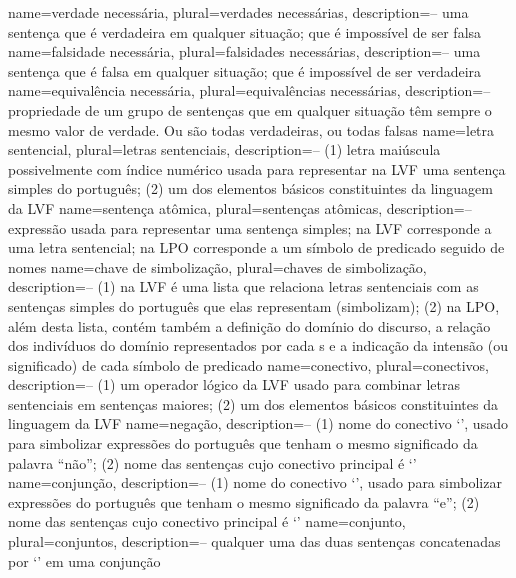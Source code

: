 {
name={verdade necessária},
plural={verdades necessárias},
description={-- uma sentença que é verdadeira em qualquer situação; que é impossível de ser falsa}
}
{
name={falsidade necessária},
plural={falsidades necessárias},
description={-- uma sentença que é falsa em qualquer situação; que é impossível de ser verdadeira}
}
{
 name={equivalência necessária},
 plural={equivalências necessárias},
 description={-- propriedade de um grupo de sentenças que em qualquer situação têm sempre o mesmo valor de verdade. Ou são todas verdadeiras, ou todas falsas}
}
{
name=letra sentencial,
plural=letras sentenciais,
description={-- (1) letra maiúscula possivelmente com índice numérico usada para representar na LVF uma sentença simples do português; (2) um dos elementos básicos constituintes da linguagem da LVF}
}
{
name=sentença atômica,
plural=sentenças atômicas,
description={-- expressão usada para representar uma sentença simples; na LVF corresponde a uma letra sentencial; na LPO corresponde a um símbolo de predicado seguido de nomes}
}
{
name=chave de simbolização,
plural=chaves de simbolização,
description={-- (1) na LVF é uma lista que relaciona letras sentenciais com as sentenças simples do português que elas representam (simbolizam); (2) na LPO, além desta lista, contém também a definição do domínio do discurso, a relação dos indivíduos do domínio representados por cada s e a indicação da intensão (ou significado) de cada símbolo de predicado}
}
{
name=conectivo,
plural=conectivos,
description={-- (1) um operador lógico da LVF usado para combinar letras sentenciais em sentenças maiores; (2) um dos elementos básicos constituintes da linguagem da LVF}
}
{
name=negação,
description={-- (1) nome do conectivo `\enot', usado para simbolizar expressões do português que tenham o mesmo significado da palavra ``não''; (2) nome das sentenças cujo conectivo principal é `\enot'}
}
{
name=conjunção,
description={-- (1) nome do conectivo `\eand', usado para simbolizar expressões do português que tenham o mesmo significado da palavra ``e''; (2) nome das sentenças cujo conectivo principal é `\eand'}
}
{
name=conjunto,
plural=conjuntos,
description={-- qualquer uma das duas sentenças concatenadas por `\eand' em uma conjunção}
}
